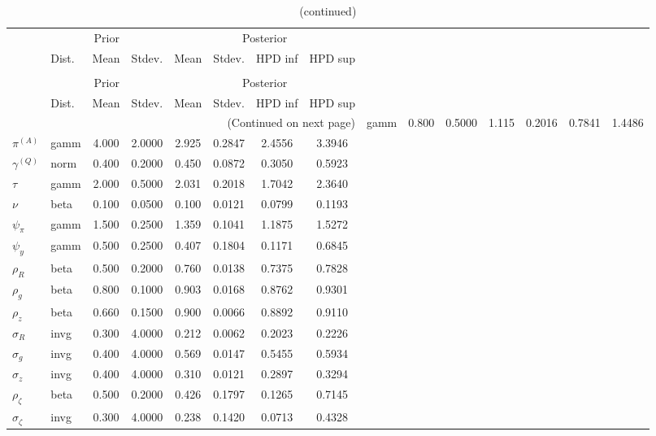  
\begin{center}
\begin{longtable}{llcccccc} 
\caption{Results from Metropolis-Hastings (parameters)}
 \label{Table:MHPosterior:1}\\
\toprule 
  & \multicolumn{3}{c}{Prior}  &  \multicolumn{4}{c}{Posterior} \\
  \cmidrule(r{.75em}){2-4} \cmidrule(r{.75em}){5-8}
  & Dist. & Mean  & Stdev. & Mean & Stdev. & HPD inf & HPD sup\\
\midrule \endfirsthead 
\caption{(continued)}\\\toprule 
  & \multicolumn{3}{c}{Prior}  &  \multicolumn{4}{c}{Posterior} \\
  \cmidrule(r{.75em}){2-4} \cmidrule(r{.75em}){5-8}
  & Dist. & Mean  & Stdev. & Mean & Stdev. & HPD inf & HPD sup\\
\midrule \endhead 
\bottomrule \multicolumn{8}{r}{(Continued on next page)} \endfoot 
\bottomrule \endlastfoot 
${r_{A}}$ & gamm &   0.800 & 0.5000 &   1.115& 0.2016 &  0.7841 &  1.4486 \\ 
${\pi^{(A)}}$ & gamm &   4.000 & 2.0000 &   2.925& 0.2847 &  2.4556 &  3.3946 \\ 
${\gamma^{(Q)}}$ & norm &   0.400 & 0.2000 &   0.450& 0.0872 &  0.3050 &  0.5923 \\ 
${\tau}$ & gamm &   2.000 & 0.5000 &   2.031& 0.2018 &  1.7042 &  2.3640 \\ 
${\nu}$ & beta &   0.100 & 0.0500 &   0.100& 0.0121 &  0.0799 &  0.1193 \\ 
${\psi_\pi}$ & gamm &   1.500 & 0.2500 &   1.359& 0.1041 &  1.1875 &  1.5272 \\ 
${\psi_y}$ & gamm &   0.500 & 0.2500 &   0.407& 0.1804 &  0.1171 &  0.6845 \\ 
${\rho_R}$ & beta &   0.500 & 0.2000 &   0.760& 0.0138 &  0.7375 &  0.7828 \\ 
${\rho_{g}}$ & beta &   0.800 & 0.1000 &   0.903& 0.0168 &  0.8762 &  0.9301 \\ 
${\rho_z}$ & beta &   0.660 & 0.1500 &   0.900& 0.0066 &  0.8892 &  0.9110 \\ 
${\sigma_R}$ & invg &   0.300 & 4.0000 &   0.212& 0.0062 &  0.2023 &  0.2226 \\ 
${\sigma_{g}}$ & invg &   0.400 & 4.0000 &   0.569& 0.0147 &  0.5455 &  0.5934 \\ 
${\sigma_z}$ & invg &   0.400 & 4.0000 &   0.310& 0.0121 &  0.2897 &  0.3294 \\ 
${\rho_\zeta}$ & beta &   0.500 & 0.2000 &   0.426& 0.1797 &  0.1265 &  0.7145 \\ 
${\sigma_\zeta}$ & invg &   0.300 & 4.0000 &   0.238& 0.1420 &  0.0713 &  0.4328 \\ 
\end{longtable}
 \end{center}
